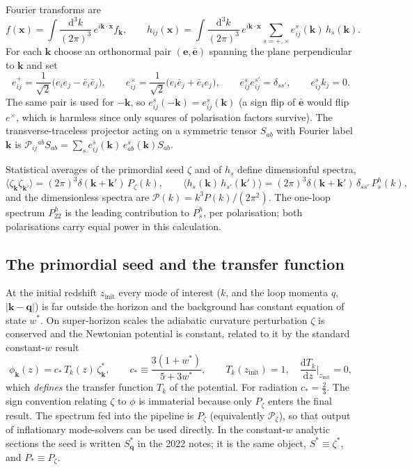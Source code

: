 \documentclass[11pt,a4paper]{article}
\newcommand{\cP}{\mathcal{P}}
\newcommand{\dd}{\mathrm{d}}
\newcommand{\vk}{\mathbf{k}}
\newcommand{\vq}{\mathbf{q}}
\newcommand{\vx}{\mathbf{x}}
\newcommand{\ve}{\mathbf{e}}
\newcommand{\vebar}{\bar{\mathbf{e}}}
\newcommand{\zinit}{z_{\mathrm{init}}}
\newcommand{\wstar}{w^{*}}
\newcommand{\cstar}{c_{*}}
\theoremstyle{remark}
\begin{document}
Fourier transforms are
\begin{equation}
f(\vx) = \int\frac{\dd^3k}{(2\pi)^3}\,e^{i\vk\cdot\vx}f_{\vk},
\qquad
h_{ij}(\vx) = \int\frac{\dd^3k}{(2\pi)^3}\,e^{i\vk\cdot\vx}\sum_{s=+,\times}e^{s}_{ij}(\vk)\,h_s(\vk).
\label{eq:fourier}
\end{equation}
For each $\vk$ choose an orthonormal pair $(\ve,\vebar)$ spanning the plane perpendicular to $\vk$ and set
\begin{equation}
e^{+}_{ij} = \frac{1}{\sqrt2}\big(e_ie_j - \bar e_i\bar e_j\big),\qquad
e^{\times}_{ij} = \frac{1}{\sqrt2}\big(e_i\bar e_j + \bar e_ie_j\big),\qquad
e^{s}_{ij}e^{s'}_{ij} = \delta_{ss'},\qquad e^s_{ij}k_j = 0.
\label{eq:polarisation}
\end{equation}
The same pair is used for $-\vk$, so $e^s_{ij}(-\vk) = e^s_{ij}(\vk)$ (a sign flip of $\vebar$ would flip $e^\times$, which is harmless since only squares of polarisation factors survive). The transverse-traceless projector acting on a symmetric tensor $S_{ab}$ with Fourier label $\vk$ is $\mathcal{P}_{ij}{}^{ab}S_{ab} = \sum_se^s_{ij}(\vk)\,e^s_{ab}(\vk)S_{ab}$.

Statistical averages of the primordial seed $\zeta$ and of $h_s$ define dimensionful spectra,
\begin{equation}
\big\langle\zeta_{\vk}\zeta_{\vk'}\big\rangle = (2\pi)^3\delta(\vk+\vk')\,P_\zeta(k),
\qquad
\big\langle h_s(\vk)\,h_{s'}(\vk')\big\rangle = (2\pi)^3\delta(\vk+\vk')\,\delta_{ss'}\,P^h_{s}(k),
\label{eq:P-def}
\end{equation}
and the dimensionless spectra are $\cP(k) = k^3P(k)/(2\pi^2)$. The one-loop spectrum $P^h_{22}$ is the leading contribution to $P^h_s$, per polarisation; both polarisations carry equal power in this calculation.

\subsection{The primordial seed and the transfer function}
\label{sec:seed}

At the initial redshift $\zinit$ every mode of interest ($k$, and the loop momenta $q$, $|\vk-\vq|$) is far outside the horizon and the background has constant equation of state $\wstar$. On super-horizon scales the adiabatic curvature perturbation $\zeta$ is conserved and the Newtonian potential is constant, related to it by the standard constant-$w$ result
\begin{equation}
\phi_{\vk}(z) = \cstar\,T_k(z)\,\zeta^{*}_{\vk},
\qquad
\cstar \equiv \frac{3(1+\wstar)}{5+3\wstar},
\qquad T_k(\zinit) = 1,\quad \frac{\dd T_k}{\dd z}\Big|_{\zinit} = 0,
\label{eq:seed}
\end{equation}
which \emph{defines} the transfer function $T_k$ of the potential. For radiation $\cstar = \tfrac23$. The sign convention relating $\zeta$ to $\phi$ is immaterial because only $P_\zeta$ enters the final result. The spectrum fed into the pipeline is $P_\zeta$ (equivalently $\cP_\zeta$), so that output of inflationary mode-solvers can be used directly. In the constant-$w$ analytic sections the seed is written $S^*_{\vq}$ in the 2022 notes; it is the same object, $S^*\equiv\zeta^*$, and $P_*\equiv P_\zeta$.
\end{document}
